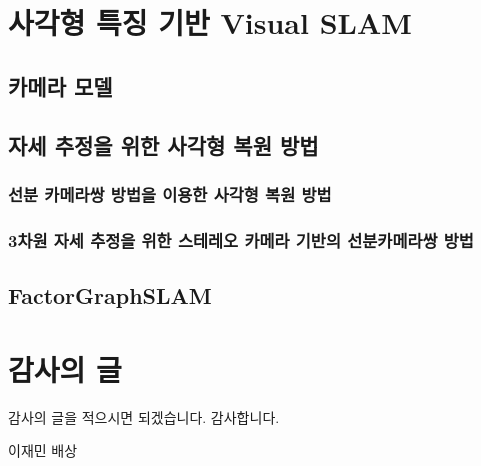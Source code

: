 \documentclass[master,korean,final]{cbnu-ecs}
\begin{document}
\chapter{사각형 특징 기반 Visual SLAM}
\section{카메라 모델}
\section{}
\section{자세 추정을 위한 사각형 복원 방법}
\cite{Guerrero2008}%
\cite{Nister2005}%

\cite{Lee2012,Lee2013}
\cite{Lee2014}
\subsection{선분 카메라쌍 방법을 이용한 사각형 복원 방법}
\subsection{3차원 자세 추정을 위한 스테레오 카메라 기반의 선분카메라쌍 방법}
\section{FactorGraphSLAM}
\cite{Dellaert2006}%
\cite{Kaess2007}%
\cite{Kaess2011}%



%
%
%


\chapter*{감사의 글}

감사의 글을 적으시면 되겠습니다.
감사합니다.

\begin{flushright}
\vspace{1cm}
이재민 배상
\end{flushright}
\end{document}
